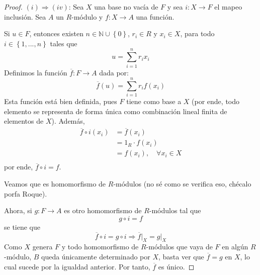 \documentclass[12pt]{report}
\newcounter{it}
\theoremstyle{largebreak}
\newcommand\cf[3]{\ensuremath{#1:#2\rightarrow#3}}
\begin{document}
    \begin{proof}
        $(i)\Rightarrow(iv)$: Sea $X$ una base no vacía de $F$ y sea $\cf{i}{X}{F}$ el mapeo inclusión. Sea $A$ un $R$-módulo y $\cf{f}{X}{A}$ una función.

        Si $u\in F$, entonces existen $n\in\mathbb{N}\cup\left\{0\right\}$, $r_i\in R$ y $x_i\in X$, para todo $i\in\left\{1,...,n\right\}$ tales que
        \begin{equation*}
            u=\sum_{ i=1}^n r_i x_i
        \end{equation*}
        Definimos la función $\cf{\overline{f}}{F}{A}$ dada por:
        \begin{equation*}
            \overline{f}(u)=\sum_{ i=1}^n r_if(x_i)
        \end{equation*}
        Esta función está bien definida, pues $F$ tiene como base a $X$ (por ende, todo elemento se representa de forma única como combinación lineal finita de elementos de $X$). Además,
        \begin{equation*}
            \begin{split}
                \overline{f}\circ i(x_i)&=\overline{f}(x_i)\\
                &=1_R\cdot f(x_i) \\
                &=f(x_i),\quad\forall x_i\in X \\
            \end{split}
        \end{equation*}
        por ende, $\overline{f}\circ i=f$.

        Veamos que es homomorfismo de $R$-módulos (no sé como se verifica eso, chécalo porfa Roque).

        Ahora, si $\cf{g}{F}{A}$ es otro homomorfismo de $R$-módulos tal que
        \begin{equation*}
            g\circ i=f
        \end{equation*}
        se tiene que
        \begin{equation*}
            \overline{f}\circ i=g\circ i\Rightarrow \overline{f}\big|_{X}=g\big|_{X}
        \end{equation*}
        Como $X$ genera $F$ y todo homomorfismo de $R$-módulos que vaya de $F$ en algún $R$-módulo, $B$ queda únicamente determinado por $X$, basta ver que $\overline{f}=g$ en $X$, lo cual sucede por la igualdad anterior. Por tanto, $\overline{f}$ es único.


\end{proof}
\end{document}
